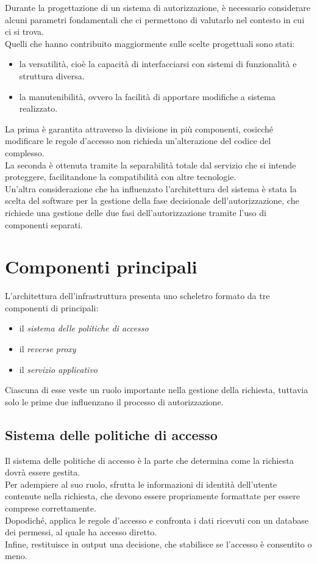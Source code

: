 Durante la progettazione di un sistema di autorizzazione, è necessario considerare alcuni parametri fondamentali
 che ci permettono di valutarlo 
nel contesto in cui ci si trova.
\\ Quelli che hanno contribuito maggiormente sulle scelte progettuali sono stati:
\begin{itemize}
    \item la versatilità, cioè la capacità di interfacciarsi con sistemi di 
    funzionalità e struttura diversa.
    \item la manutenibilità, ovvero la facilità di apportare modifiche a sistema realizzato.
\end{itemize}
La prima è garantita attraverso la divisione in più componenti, cosicché modificare le regole d'accesso non richieda
un'alterazione del codice del complesso. 
\\ La seconda è ottenuta tramite la separabilità totale dal servizio che si intende proteggere,
 facilitandone la compatibilità con altre tecnologie.  
\\ Un'altra considerazione che ha influenzato l'architettura del sistema è stata la scelta del software per la gestione 
della fase decisionale dell'autorizzazione, che richiede una gestione delle due fasi dell'autorizzazione tramite l'uso di componenti separati. 

\section{Componenti principali}

L'architettura dell'infrastruttura presenta uno scheletro formato da tre componenti di principali: 
\begin{itemize}
    \item il \textit{sistema delle politiche di accesso}
    \item il \textit{reverse proxy}
    \item il \textit{servizio applicativo}
\end{itemize}
Ciascuna di esse veste un ruolo importante nella gestione della richiesta, tuttavia solo le prime due influenzano il processo di autorizzazione. 

\subsection{Sistema delle politiche di accesso}
Il sistema delle politiche di accesso è la parte che determina come la richiesta dovrà essere gestita. 
\\ Per adempiere al suo ruolo, sfrutta le informazioni di identità dell'utente contenute nella richiesta, 
che devono essere propriamente formattate per essere comprese correttamente. 
\\ Dopodiché, applica le regole d'accesso e confronta i dati ricevuti con un database dei permessi, al quale ha accesso diretto.
\\Infine, restituisce in output una decisione, che stabilisce se l'accesso è consentito o meno.  

